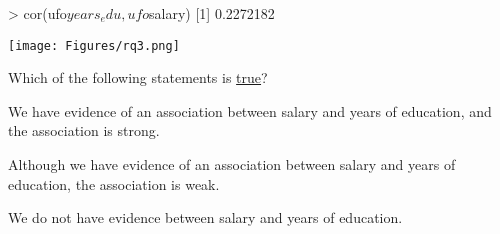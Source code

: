 \begin{frame}[fragile]
\begin{lcverbatim}
> cor(ufo$years_edu,ufo$salary)
[1] 0.2272182
\end{lcverbatim}
\texttt{[image: Figures/rq3.png]}\\
\begin{clicker}{\small{Which of the following statements is \underline{true}?}}
\begin{enumerate}
    \small{
    \item
    We have evidence of an association between salary and years of education, and the association is strong.
    \item
    Although we have evidence of an association between salary and years of education, the association is weak.
    \item
    We do not have evidence between salary and years of education.
}
\end{enumerate}
\end{clicker}
\end{frame}



